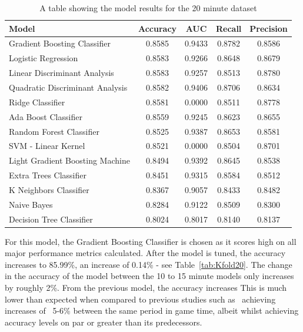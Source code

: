 \begin{table}[h]
    \centering
    \begin{tabular}{l c c c c }
        \toprule
        \textbf{Model} & \textbf{Accuracy} & \textbf{AUC} & \textbf{Recall} & \textbf{Precision} \\
        \midrule
        Gradient Boosting Classifier & 0.8585 & 0.9433 & 0.8782 & 0.8586  \\
        Logistic Regression & 0.8583 & 0.9266 & 0.8648 & 0.8679 \\
        Linear Discriminant Analysis & 0.8583 & 0.9257 & 0.8513 & 0.8780 \\
        Quadratic Discriminant Analysis & 0.8582 & 0.9406 & 0.8706 & 0.8634 \\
        Ridge Classifier & 0.8581 & 0.0000 & 0.8511 & 0.8778 \\
        Ada Boost Classifier & 0.8559 & 0.9245 & 0.8623 & 0.8655 \\
        Random Forest Classifier & 0.8525 & 0.9387 & 0.8653 & 0.8581 \\
        SVM - Linear Kernel & 0.8521 & 0.0000 & 0.8504 & 0.8701 \\
        Light Gradient Boosting Machine & 0.8494 & 0.9392 & 0.8645 & 0.8538  \\
        Extra Trees Classifier & 0.8451 & 0.9315 & 0.8584 & 0.8512 \\
        K Neighbors Classifier & 0.8367 & 0.9057 & 0.8433 & 0.8482 \\
        Naive Bayes & 0.8284 & 0.9122 & 0.8509 & 0.8300 \\
        Decision Tree Classifier & 0.8024 & 0.8017 & 0.8140 & 0.8137\\
        \bottomrule
    \end{tabular}
    \caption{A table showing the model results for the 20 minute dataset}
    \label{tab:ModelResults20}
\end{table}

For this model, the Gradient Boosting Classifier is chosen as it scores high on all major performance metrics calculated.
After the model is tuned, the accuracy increases to 85.99\%, an increase of 0.14\% - see Table~\ref{tab:Kfold20}.
The change in the accuracy of the model between the 10 to 15 minute models only increases by roughly 2\%.
From the previous model, the accuracy increases
This is much lower than expected when compared to previous studies such as~\citet{silva2018continuous, lee2020predicting} achieving increases of ~5-6\% between the same period in game time, albeit whilst achieving accuracy levels on par or greater than its predecessors. \\

